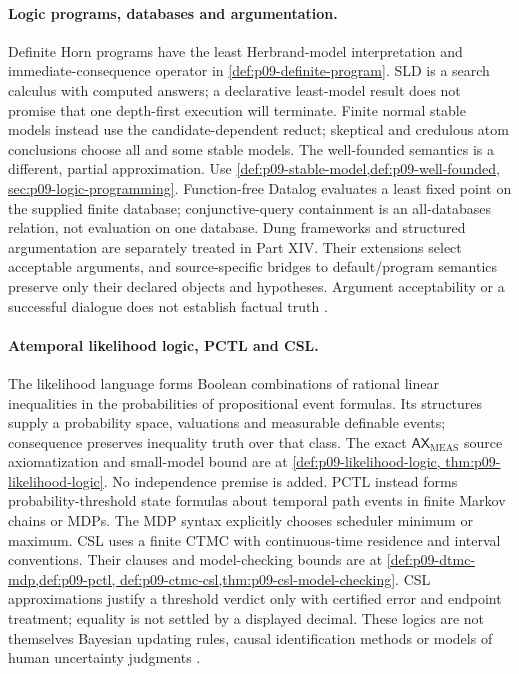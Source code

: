 \paragraph{Logic programs, databases and argumentation.}
\label{entry:p14-directory-logic-programs}
Definite Horn programs have the least Herbrand-model interpretation and
immediate-consequence operator in \cref{def:p09-definite-program}.
SLD is a search calculus with computed answers; a declarative least-model
result does not promise that one depth-first execution will terminate.
Finite normal stable models instead use the candidate-dependent reduct;
skeptical and credulous atom conclusions choose all and some stable models.
The well-founded semantics is a different, partial approximation.
Use \cref{def:p09-stable-model,def:p09-well-founded,
sec:p09-logic-programming}. Function-free Datalog evaluates a least
fixed point on the supplied finite database; conjunctive-query containment
is an all-databases relation, not evaluation on one database.
Dung frameworks and structured argumentation are separately treated in
Part XIV. Their extensions select acceptable arguments, and source-specific
bridges to default/program semantics preserve only their declared
objects and hypotheses. Argument acceptability or a successful dialogue
does not establish factual truth \cite{VanEmdenKowalski1976,Lloyd1987,
GelfondLifschitz1988,VanGelderRossSchlipf1991,ChandraMerlin1977,Dung1995}.

\paragraph{Atemporal likelihood logic, PCTL and CSL.}
\label{entry:p14-directory-probability}
The likelihood language forms Boolean combinations of rational linear
inequalities in the probabilities of propositional event formulas.
Its structures supply a probability space, valuations and measurable
definable events; consequence preserves inequality truth over that class.
The exact \(\mathsf{AX}_{\mathrm{MEAS}}\) source axiomatization and
small-model bound are at \cref{def:p09-likelihood-logic,
thm:p09-likelihood-logic}. No independence premise is added.
PCTL instead forms probability-threshold state formulas about temporal
path events in finite Markov chains or MDPs. The MDP syntax explicitly
chooses scheduler minimum or maximum. CSL uses a finite CTMC with
continuous-time residence and interval conventions. Their clauses and
model-checking bounds are at \cref{def:p09-dtmc-mdp,def:p09-pctl,
def:p09-ctmc-csl,thm:p09-csl-model-checking}.
CSL approximations justify a threshold verdict only with certified error
and endpoint treatment; equality is not settled by a displayed decimal.
These logics are not themselves Bayesian updating rules, causal
identification methods or models of human uncertainty judgments
\cite{FaginHalpernMegiddo1990,Halpern2003,BaierKatoen2008,
BaierHaverkortHermannsKatoen2003}.

